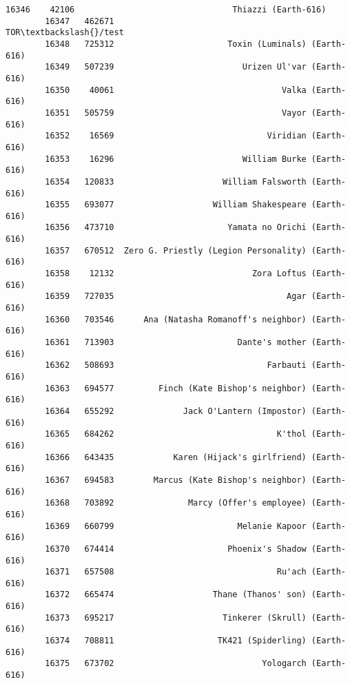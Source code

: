 \documentclass[11pt]{article}
\begin{document}
\begin{Verbatim}[commandchars=\\\{\}]
        16346    42106                                Thiazzi (Earth-616)   
        16347   462671                                          TOR\textbackslash{}/test   
        16348   725312                       Toxin (Luminals) (Earth-616)   
        16349   507239                          Urizen Ul'var (Earth-616)   
        16350    40061                                  Valka (Earth-616)   
        16351   505759                                  Vayor (Earth-616)   
        16352    16569                               Viridian (Earth-616)   
        16353    16296                          William Burke (Earth-616)   
        16354   120833                      William Falsworth (Earth-616)   
        16355   693077                    William Shakespeare (Earth-616)   
        16356   473710                       Yamata no Orichi (Earth-616)   
        16357   670512  Zero G. Priestly (Legion Personality) (Earth-616)   
        16358    12132                            Zora Loftus (Earth-616)   
        16359   727035                                   Agar (Earth-616)   
        16360   703546      Ana (Natasha Romanoff's neighbor) (Earth-616)   
        16361   713903                         Dante's mother (Earth-616)   
        16362   508693                               Farbauti (Earth-616)   
        16363   694577         Finch (Kate Bishop's neighbor) (Earth-616)   
        16364   655292              Jack O'Lantern (Impostor) (Earth-616)   
        16365   684262                                 K'thol (Earth-616)   
        16366   643435            Karen (Hijack's girlfriend) (Earth-616)   
        16367   694583        Marcus (Kate Bishop's neighbor) (Earth-616)   
        16368   703892               Marcy (Offer's employee) (Earth-616)   
        16369   660799                         Melanie Kapoor (Earth-616)   
        16370   674414                       Phoenix's Shadow (Earth-616)   
        16371   657508                                 Ru'ach (Earth-616)   
        16372   665474                    Thane (Thanos' son) (Earth-616)   
        16373   695217                      Tinkerer (Skrull) (Earth-616)   
        16374   708811                     TK421 (Spiderling) (Earth-616)   
        16375   673702                              Yologarch (Earth-616)   
        

\end{Verbatim}
\end{document}
